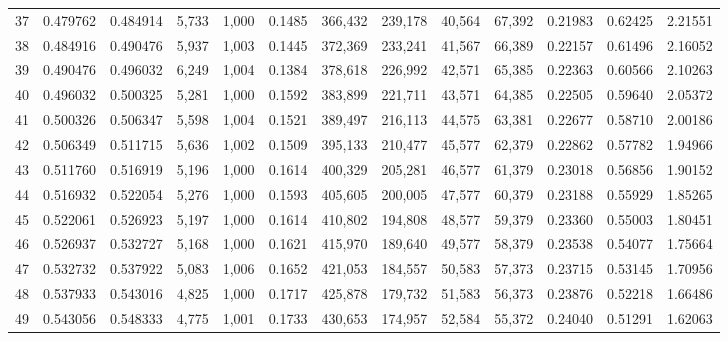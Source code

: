 \begin{tabular}{rrrrrrrrrrrrr}
37  &  0.479762 &  0.484914 &   5,733 &  1,000 &                                     0.1485 &  366,432 &  239,178 &   40,564 &   67,392 &  0.21983 &  0.62425 &  2.21551 \\
38  &  0.484916 &  0.490476 &   5,937 &  1,003 &                                     0.1445 &  372,369 &  233,241 &   41,567 &   66,389 &  0.22157 &  0.61496 &  2.16052 \\
39  &  0.490476 &  0.496032 &   6,249 &  1,004 &                                     0.1384 &  378,618 &  226,992 &   42,571 &   65,385 &  0.22363 &  0.60566 &  2.10263 \\
40  &  0.496032 &  0.500325 &   5,281 &  1,000 &                                     0.1592 &  383,899 &  221,711 &   43,571 &   64,385 &  0.22505 &  0.59640 &  2.05372 \\
41  &  0.500326 &  0.506347 &   5,598 &  1,004 &                                     0.1521 &  389,497 &  216,113 &   44,575 &   63,381 &  0.22677 &  0.58710 &  2.00186 \\
42  &  0.506349 &  0.511715 &   5,636 &  1,002 &                                     0.1509 &  395,133 &  210,477 &   45,577 &   62,379 &  0.22862 &  0.57782 &  1.94966 \\
43  &  0.511760 &  0.516919 &   5,196 &  1,000 &                                     0.1614 &  400,329 &  205,281 &   46,577 &   61,379 &  0.23018 &  0.56856 &  1.90152 \\
44  &  0.516932 &  0.522054 &   5,276 &  1,000 &                                     0.1593 &  405,605 &  200,005 &   47,577 &   60,379 &  0.23188 &  0.55929 &  1.85265 \\
45  &  0.522061 &  0.526923 &   5,197 &  1,000 &                                     0.1614 &  410,802 &  194,808 &   48,577 &   59,379 &  0.23360 &  0.55003 &  1.80451 \\
46  &  0.526937 &  0.532727 &   5,168 &  1,000 &                                     0.1621 &  415,970 &  189,640 &   49,577 &   58,379 &  0.23538 &  0.54077 &  1.75664 \\
47  &  0.532732 &  0.537922 &   5,083 &  1,006 &                                     0.1652 &  421,053 &  184,557 &   50,583 &   57,373 &  0.23715 &  0.53145 &  1.70956 \\
48  &  0.537933 &  0.543016 &   4,825 &  1,000 &                                     0.1717 &  425,878 &  179,732 &   51,583 &   56,373 &  0.23876 &  0.52218 &  1.66486 \\
49  &  0.543056 &  0.548333 &   4,775 &  1,001 &                                     0.1733 &  430,653 &  174,957 &   52,584 &   55,372 &  0.24040 &  0.51291 &  1.62063 \\

\end{tabular}
